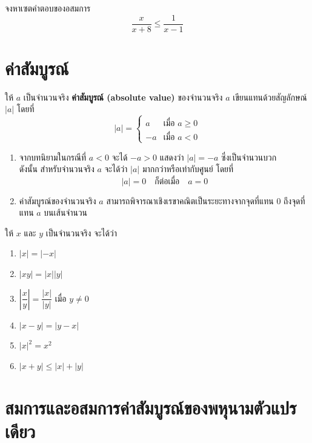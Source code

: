 \begin{examplebox}
	จงหาเซตคำตอบของอสมการ 
	$$\dfrac{x}{x+8} \leq \dfrac{1}{x-1}$$
\end{examplebox}
\solution
\newpage
\section{ค่าสัมบูรณ์}

\begin{definitionbox}\label{definition1.6}
	ให้ $a$ เป็นจำนวนจริง \textbf{ค่าสัมบูรณ์ (absolute value)} ของจำนวนจริง $a$ เขียนแทนด้วยสัญลักษณ์ $|a|$ โดยที่
	$$|a| = \begin{cases}
		a & \text{เมื่อ } a \geq 0 \\
		-a & \text{เมื่อ } a < 0
	\end{cases}$$
\end{definitionbox}

\vspace{1em}

\remark
\begin{enumerate}[label=\arabic*., leftmargin=2em, itemsep=0.8em]
	\item จากบทนิยามในกรณีที่ $a < 0$ จะได้ $-a > 0$ แสดงว่า $|a| = -a$ ซึ่งเป็นจำนวนบวก 
	\\
	ดังนั้น สำหรับจำนวนจริง $a$ จะได้ว่า $|a|$ มากกว่าหรือเท่ากับศูนย์ โดยที่
	$$|a| = 0 \quad \text{ก็ต่อเมื่อ} \quad a = 0$$
	
	\item ค่าสัมบูรณ์ของจำนวนจริง $a$ สามารถพิจารณาเชิงเรขาคณิตเป็นระยะทางจากจุดที่แทน $0$ ถึงจุดที่แทน $a$ บนเส้นจำนวน
\end{enumerate}

\begin{theorembox}
	ให้ $x$ และ $y$ เป็นจำนวนจริง จะได้ว่า
	\begin{enumerate}[label=\arabic*., leftmargin=*]
		\item $|x|=|-x|$
		\item $|x y|=|x||y|$
		\item $\left|\dfrac{x}{y}\right|=\dfrac{|x|}{|y|}$ เมื่อ $y \neq 0$
		\item $|x-y|=|y-x|$
		\item $|x|^2=x^2$
		\item $|x+y| \leq|x|+|y|$
	\end{enumerate}
\end{theorembox}

\newpage

\section{สมการและอสมการค่าสัมบูรณ์ของพหุนามตัวแปรเดียว}

